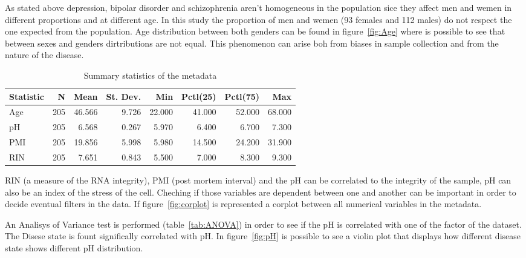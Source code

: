\documentclass[11pt, onecolumn, twoside]{article}
\begin{document}
As stated above depression, bipolar disorder and schizophrenia aren't homogeneous in the population sice they affect men and wemen in different proportions and at different age.
In this study the proportion of men and wemen (93 females and 112 males) do not respect the one expected from the population.
Age distribution between both genders can be found in figure~\ref{fig:Age} where is possible to see that between sexes and genders dirtributions are not equal.
This phenomenon can arise boh from biases in sample collection and from the nature of the disease.

\begin{table*}
    \centering
    \caption{Summary statistics of the metadata}
    \label{tab:summary}
    \begin{tabular}{@{\extracolsep{5pt}}lrrrrrrr}
        \toprule
        Statistic & N   & Mean  & St. Dev. & Min    & Pctl(25) & Pctl(75) & Max \\
        \midrule
        Age       & 205 & 46.566& 9.726    & 22.000 & 41.000   & 52.000   & 68.000 \\
        pH        & 205 & 6.568 & 0.267    & 5.970  & 6.400    & 6.700    & 7.300 \\
        PMI       & 205 & 19.856& 5.998    & 5.980  & 14.500   & 24.200   & 31.900 \\
        RIN       & 205 & 7.651 & 0.843    & 5.500  & 7.000    & 8.300    & 9.300 \\
        \bottomrule
    \end{tabular}
\end{table*}

RIN (a measure of the RNA integrity), PMI (post mortem interval) and the pH can be correlated to the integrity of the sample, pH can also be an index of the stress of the cell.
Cheching if those variables are dependent between one and another can be important in order to decide eventual filters in the data.
If figure~\ref{fig:corplot} is represented a corplot between all numerical variables in the metadata.

An Analisys of Variance test is performed (table~\ref{tab:ANOVA}) in order to see if the pH is correlated with one of the factor of the dataset.
The Disese state is fount significally correlated with pH.
In figure~\ref{fig:pH} is possible to see a violin plot that displays how different disease state shows different pH distribution.
\end{document}

